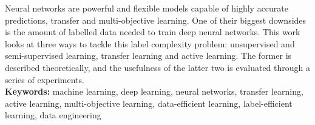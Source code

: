 \noindent
Neural networks are powerful and flexible models capable of highly accurate predictions, transfer and multi-objective learning.
One of their biggest downsides is the amount of labelled data needed to train deep neural networks.
This work looks at three ways to tackle this label complexity problem: unsupervised and semi-supervised learning, transfer learning and active learning.
The former is described theoretically, and the usefulness of the latter two is evaluated through a series of experiments.
\\

\noindent
\textbf{Keywords:} machine learning, deep learning, neural networks, transfer learning, active learning, multi-objective learning, data-efficient learning, label-efficient learning, data engineering
